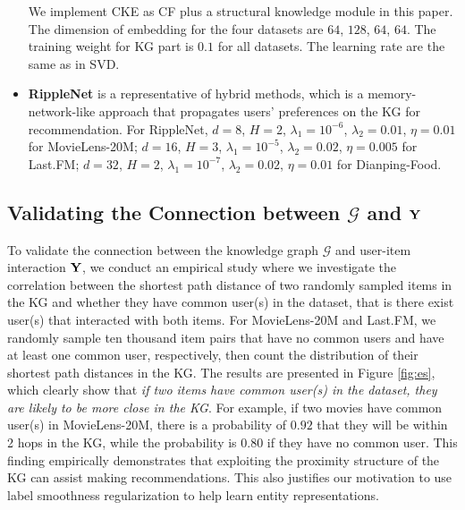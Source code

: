 \documentclass[sigconf]{acmart}
\begin{document}
\begin{itemize}
				We implement CKE as CF plus a structural knowledge module in this paper.
				The dimension of embedding for the four datasets are $64$, $128$, $64$, $64$.
				The training weight for KG part is $0.1$ for all datasets.
				The learning rate are the same as in SVD.
			\item
				\textbf{RippleNet} \cite{wang2018ripple} is a representative of hybrid methods, which is a memory-network-like approach that propagates users' preferences on the KG for recommendation.
				For RippleNet, $d=8$, $H=2$, $\lambda_1 = 10^{-6}$, $\lambda_2=0.01$, $\eta=0.01$ for MovieLens-20M; $d=16$, $H=3$, $\lambda_1 = 10^{-5}$, $\lambda_2=0.02$, $\eta=0.005$ for Last.FM; $d=32$, $H=2$, $\lambda_1 = 10^{-7}$, $\lambda_2=0.02$, $\eta=0.01$ for Dianping-Food.
		\end{itemize}
			
		
	\subsection{Validating the Connection between $\mathcal G$ and $\bf Y$}
    	To validate the connection between the knowledge graph $\mathcal G$ and user-item interaction $\bf Y$, we conduct an empirical study where we investigate the correlation between the shortest path distance of two randomly sampled items in the KG and whether they have common user(s) in the dataset, that is there exist user(s) that interacted with both items.
		For MovieLens-20M and Last.FM, we randomly sample ten thousand item pairs that have no common users and have at least one common user, respectively, then count the distribution of their shortest path distances in the KG.
		The results are presented in Figure \ref{fig:es}, which clearly show that \textit{if two items have common user(s) in the dataset, they are likely to be more close in the KG}.
		For example, if two movies have common user(s) in MovieLens-20M, there is a probability of $0.92$ that they will be within 2 hops in the KG, while the probability is $0.80$ if they have no common user.
		This finding empirically demonstrates that exploiting the proximity structure of the KG can assist making recommendations.
		This also justifies our motivation to use label smoothness regularization to help learn entity representations.
       	
\end{document}
